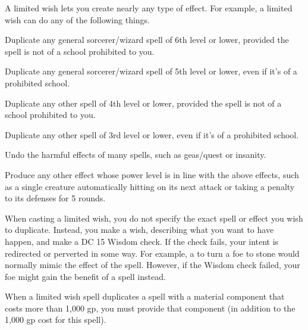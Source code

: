 \begin{spelleffect}
    A limited wish lets you create nearly any type of effect. For example, a limited wish can do any of the following things.
    \begin{itemize*}
        \item Duplicate any general sorcerer/wizard spell of 6th level or lower, provided the spell is not of a school prohibited to you.
        \item Duplicate any general sorcerer/wizard spell of 5th level or lower, even if it's of a prohibited school.
        \item Duplicate any other spell of 4th level or lower, provided the spell is not of a school prohibited to you.
        \item Duplicate any other spell of 3rd level or lower, even if it's of a prohibited school.
        \item Undo the harmful effects of many spells, such as geas/quest or insanity.
        \item Produce any other effect whose power level is in line with the above effects, such as a single creature automatically hitting on its next attack or taking a  penalty to its defenses for 5 rounds.
    \end{itemize*}
    \par When casting a limited wish, you do not specify the exact spell or effect you wish to duplicate. Instead, you make a wish, describing what you want to have happen, and make a DC 15 Wisdom check. If the check fails, your intent is redirected or perverted in some way. For example, a  to turn a foe to stone would normally mimic the  effect of the  spell. However, if the Wisdom check failed, your foe might gain the benefit of a  spell instead.
    \par When a limited wish spell duplicates a spell with a material component that costs more than 1,000 gp, you must provide that component (in addition to the 1,000 gp cost for this spell).
\end{spelleffect}

